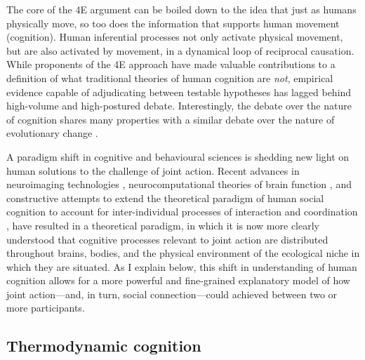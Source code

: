 \begin{CJK}{UTF8}{gbsn}
The core of the 4E argument can be boiled down to the idea that just as humans physically move, so too does the information that supports human movement (cognition).  Human inferential processes not only activate physical movement, but are also activated by movement, in a dynamical loop of reciprocal causation.  While proponents of the 4E approach have made valuable contributions to a definition of what traditional theories of human cognition are \textit{not}, empirical evidence capable of adjudicating between testable hypotheses has lagged behind high-volume and high-postured debate.  Interestingly, the debate over the nature of cognition shares many properties with a similar debate over the nature of evolutionary change \citep{Nowak2010,Scott-Phillips2011,Laland2014,Fuentes2016}.

A paradigm shift in cognitive and behavioural sciences is shedding new light on human solutions to the challenge of joint action.  Recent advances in neuroimaging technologies \citep{Frith2007}, neurocomputational theories of brain function \citep{Friston2010,Frith2010,Yufik2013,Clark2013}, and constructive attempts to extend the theoretical paradigm of human social cognition to account for inter-individual processes of interaction and coordination \citep{Sebanz2006,Dale2014}, have resulted in a theoretical paradigm, in which it is now more clearly understood that cognitive processes relevant to joint action are distributed throughout brains, bodies, and the physical environment of the ecological niche in which they are situated.  As I explain below, this shift in understanding of human cognition allows for a more powerful and fine-grained explanatory model of how joint action---and, in turn, social connection---could achieved between two or more participants.


\subsection{Thermodynamic cognition\label{sect:thermoCog}}


\end{CJK}
